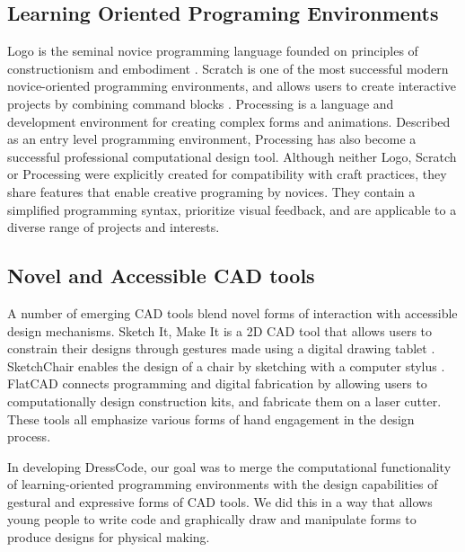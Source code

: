 \documentclass{sigchi}
\begin{document}
\subsection{Learning Oriented Programing Environments}
Logo is the seminal novice programming language founded on principles of constructionism and embodiment \cite{papert}. Scratch is one of the most successful modern novice-oriented programming environments, and allows users to create interactive projects by combining command blocks \cite{resnick2}. Processing is a language and development environment for creating complex forms and animations. Described as an entry level programming environment, Processing has also become a successful professional computational design tool\cite{processing}. Although neither Logo, Scratch or Processing were explicitly created for compatibility with craft practices, they share features that enable creative programing by novices. They contain a simplified programming syntax, prioritize visual feedback, and are applicable to a diverse range of projects and interests.
\subsection{Novel and Accessible CAD tools}
A number of emerging CAD tools blend novel forms of interaction with accessible design mechanisms. Sketch It, Make It is a 2D CAD tool that allows users to constrain their designs through gestures made using a digital drawing tablet \cite{sketchit}. SketchChair enables the design of a chair by sketching with a computer stylus \cite{sketchchair}. FlatCAD connects programming and digital fabrication by allowing users to computationally design construction kits, and fabricate them on a laser cutter\cite{flatcad}. These tools all emphasize various forms of hand engagement in the design process.

In developing DressCode, our goal was to merge the computational functionality of learning-oriented programming environments with the design capabilities of gestural and expressive forms of CAD tools. We did this in a way that allows young people to write code and graphically draw and manipulate forms to produce designs for physical making. 
\end{document}
